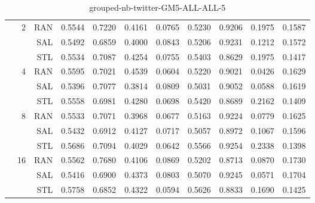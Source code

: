 \begin{center}
\begin{table}[htbp]
\begin{tabular}{ | r | r | r | r | r | r | r | r | r | r | r |}
 & \multirow{3}{*}{2} & RAN & 0.5544 & 0.7220 & 0.4161 & 0.0765 & 0.5230 & 0.9206 & 0.1975 & 0.1587\\ \cline{3-11}
 &   & SAL & 0.5492 & 0.6859 & 0.4000 & 0.0843 & 0.5206 & 0.9231 & 0.1212 & 0.1572\\ \cline{3-11}
 &   & STL & 0.5534 & 0.7087 & 0.4254 & 0.0755 & 0.5403 & 0.8629 & 0.1975 & 0.1417\\ \cline{2-11}
 & \multirow{3}{*}{4} & RAN & 0.5595 & 0.7021 & 0.4539 & 0.0604 & 0.5220 & 0.9021 & 0.0426 & 0.1629\\ \cline{3-11}
 &   & SAL & 0.5396 & 0.7077 & 0.3814 & 0.0809 & 0.5031 & 0.9052 & 0.0588 & 0.1619\\ \cline{3-11}
 &   & STL & 0.5558 & 0.6981 & 0.4280 & 0.0698 & 0.5420 & 0.8689 & 0.2162 & 0.1409\\ \cline{2-11}
 & \multirow{3}{*}{8} & RAN & 0.5533 & 0.7071 & 0.3968 & 0.0677 & 0.5163 & 0.9224 & 0.0779 & 0.1625\\ \cline{3-11}
 &   & SAL & 0.5432 & 0.6912 & 0.4127 & 0.0717 & 0.5057 & 0.8972 & 0.1067 & 0.1596\\ \cline{3-11}
 &   & STL & 0.5686 & 0.7094 & 0.4029 & 0.0642 & 0.5566 & 0.9254 & 0.2338 & 0.1398\\ \cline{2-11}
 & \multirow{3}{*}{16} & RAN & 0.5562 & 0.7680 & 0.4106 & 0.0869 & 0.5202 & 0.8713 & 0.0870 & 0.1730\\ \cline{3-11}
 &   & SAL & 0.5416 & 0.6900 & 0.4373 & 0.0803 & 0.5070 & 0.9245 & 0.0571 & 0.1704\\ \cline{3-11}
 &   & STL & 0.5758 & 0.6852 & 0.4322 & 0.0594 & 0.5626 & 0.8833 & 0.1690 & 0.1425\\ \cline{2-11}
\hline
\end{tabular}
\caption{grouped-nb-twitter-GM5-ALL-ALL-5}
\end{table}
\end{center}

